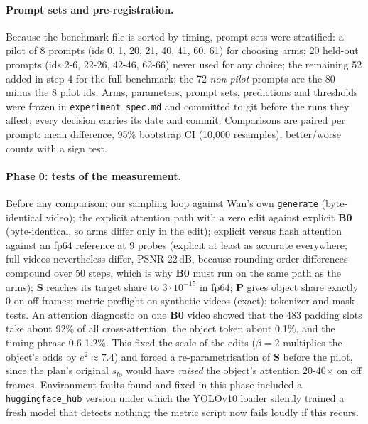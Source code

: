 \documentclass[10pt,a4paper]{article}
\newcommand{\arm}[1]{\textbf{#1}}
\begin{document}
\paragraph{Prompt sets and pre-registration.} Because the benchmark file is sorted by timing, prompt sets were stratified: a pilot of 8 prompts (ids 0, 1, 20, 21, 40, 41, 60, 61) for choosing arms; 20 held-out prompts (ids 2-6, 22-26, 42-46, 62-66) never used for any choice; the remaining 52 added in step 4 for the full benchmark; the 72 \emph{non-pilot} prompts are the 80 minus the 8 pilot ids. Arms, parameters, prompt sets, predictions and thresholds were frozen in \texttt{experiment\_spec.md} and committed to git before the runs they affect; every decision carries its date and commit. Comparisons are paired per prompt: mean difference, 95\% bootstrap CI (10{,}000 resamples), better/worse counts with a sign test.

\paragraph{Phase 0: tests of the measurement.} Before any comparison: our sampling loop against Wan's own \texttt{generate} (byte-identical video); the explicit attention path with a zero edit against explicit \arm{B0} (byte-identical, so arms differ only in the edit); explicit versus flash attention against an fp64 reference at 9 probes (explicit at least as accurate everywhere; full videos nevertheless differ, PSNR 22\,dB, because rounding-order differences compound over 50 steps, which is why \arm{B0} must run on the same path as the arms); \arm{S} reaches its target share to $3\cdot10^{-15}$ in fp64; \arm{P} gives object share exactly 0 on off frames; metric preflight on synthetic videos (exact); tokenizer and mask tests. An attention diagnostic on one \arm{B0} video showed that the 483 padding slots take about 92\% of all cross-attention, the object token about 0.1\%, and the timing phrase 0.6-1.2\%. This fixed the scale of the edits ($\beta=2$ multiplies the object's odds by $e^2\approx7.4$) and forced a re-parametrisation of \arm{S} before the pilot, since the plan's original $s_{lo}$ would have \emph{raised} the object's attention 20-40$\times$ on off frames. Environment faults found and fixed in this phase included a \texttt{huggingface\_hub} version under which the YOLOv10 loader silently trained a fresh model that detects nothing; the metric script now fails loudly if this recurs.
\end{document}
